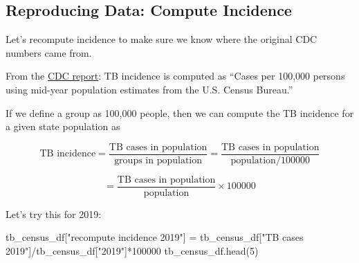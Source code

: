\documentclass[
  letterpaper,
  DIV=11,
  numbers=noendperiod]{scrreprt}
\newenvironment{Shaded}{\begin{snugshade}}{\end{snugshade}}
\newcommand{\DecValTok}[1]{\textcolor[rgb]{0.68,0.00,0.00}{#1}}
\newcommand{\NormalTok}[1]{\textcolor[rgb]{0.00,0.23,0.31}{#1}}
\newcommand{\OperatorTok}[1]{\textcolor[rgb]{0.37,0.37,0.37}{#1}}
\newcommand{\StringTok}[1]{\textcolor[rgb]{0.13,0.47,0.30}{#1}}
\begin{document}
\hypertarget{reproducing-data-compute-incidence}{%
\subsection{Reproducing Data: Compute
Incidence}\label{reproducing-data-compute-incidence}}

Let's recompute incidence to make sure we know where the original CDC
numbers came from.

From the
\href{https://www.cdc.gov/mmwr/volumes/71/wr/mm7112a1.htm?s_cid=mm7112a1_w\#T1_down}{CDC
report}: TB incidence is computed as ``Cases per 100,000 persons using
mid-year population estimates from the U.S. Census Bureau.''

If we define a group as 100,000 people, then we can compute the TB
incidence for a given state population as

\[\text{TB incidence} = \frac{\text{TB cases in population}}{\text{groups in population}} = \frac{\text{TB cases in population}}{\text{population}/100000} \]

\[= \frac{\text{TB cases in population}}{\text{population}} \times 100000\]

Let's try this for 2019:

\begin{Shaded}
\begin{Highlighting}[]
\NormalTok{tb\_census\_df[}\StringTok{"recompute incidence 2019"}\NormalTok{] }\OperatorTok{=}\NormalTok{ tb\_census\_df[}\StringTok{"TB cases 2019"}\NormalTok{]}\OperatorTok{/}\NormalTok{tb\_census\_df[}\StringTok{"2019"}\NormalTok{]}\OperatorTok{*}\DecValTok{100000}
\NormalTok{tb\_census\_df.head(}\DecValTok{5}\NormalTok{)}
\end{Highlighting}
\end{Shaded}
\end{document}
